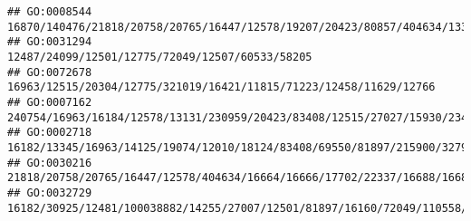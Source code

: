 \documentclass[
]{article}
\begin{document}
\begin{verbatim}
## GO:0008544                                                                                                                                                                                                                      16870/140476/21818/20758/20765/16447/12578/19207/20423/80857/404634/13393/18053/16664/16666/17702/14165/29820/22337/16688/16682/268885/433016/20861/100034684/20862/224796/494504/14419
## GO:0031294                                                                                                                                                                                                                                                                                                                                                              12487/24099/12501/12775/72049/12507/60533/58205
## GO:0072678                                                                                                                                                                                                                                                                                                                                           16963/12515/20304/12775/321019/16421/11815/71223/12458/11629/12766
## GO:0007162                                                                                                                                                                                                                                                240754/16963/16184/12578/13131/230959/20423/83408/12515/27027/15930/234199/12554/14422/56838/11815/30060/100043314/208154/14960/13078/16149/60533/58205/20371
## GO:0002718                                                                                                                                                                                                                                                                                                                  16182/13345/16963/14125/19074/12010/18124/83408/69550/81897/215900/327957/58185/16149/20371
## GO:0030216                                                                                                                                                                                                                                                                                                 21818/20758/20765/16447/12578/404634/16664/16666/17702/22337/16688/16682/268885/433016/20861/100034684/20862
## GO:0032729                                                                                                                                                                                                                                                                                                                                 16182/30925/12481/100038882/14255/27007/12501/81897/16160/72049/110558/12475

\end{verbatim}
\end{document}
